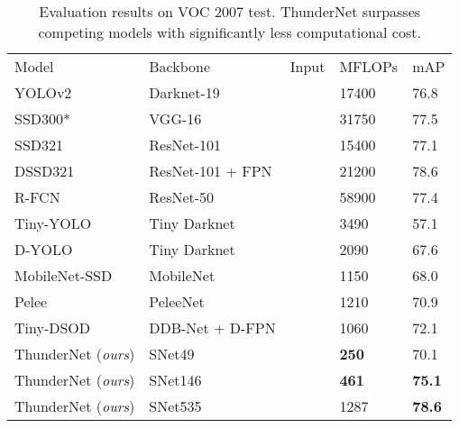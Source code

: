 \documentclass[10pt,twocolumn,letterpaper]{article}
\begin{document}
\begin{table*}[!t]
\scriptsize
\centering
\begin{tabular}{p{11em}|P{10em}|P{8em}|P{6em}|P{4em}}
Model & Backbone & Input & MFLOPs & mAP \\ 
YOLOv2 \cite{redmon2017yolo9000} & Darknet-19 &  & 17400 & 76.8 \\
SSD300* \cite{liu2016ssd} & VGG-16 &  & 31750 & 77.5 \\
SSD321 \cite{fu2017dssd} & ResNet-101 &  & 15400 & 77.1 \\
DSSD321 \cite{fu2017dssd} & ResNet-101 + FPN &  & 21200 & 78.6 \\
R-FCN \cite{dai2016r} & ResNet-50 &  & 58900 & 77.4 \\ \hline
Tiny-YOLO \cite{redmon2017yolo9000} & Tiny Darknet &  & 3490 & 57.1 \\
D-YOLO \cite{mehta2018object} & Tiny Darknet &  & 2090 & 67.6 \\
MobileNet-SSD \cite{wang2018pelee} & MobileNet &  & 1150 & 68.0 \\
Pelee \cite{wang2018pelee} & PeleeNet &  & 1210 & 70.9 \\
Tiny-DSOD \cite{li2018tiny} & DDB-Net + D-FPN &  & 1060 & 72.1 \\ \hline
ThunderNet (\emph{ours}) & SNet49 &  & \textbf{250} & 70.1 \\
ThunderNet (\emph{ours}) & SNet146 &  & \textbf{461} & \textbf{75.1} \\
ThunderNet (\emph{ours}) & SNet535 &  & 1287 & \textbf{78.6} \\
\end{tabular}
\vspace{3pt}
\caption{
Evaluation results on VOC 2007 test.
ThunderNet surpasses competing models with significantly less computational cost.
}
\label{table:results-voc}
\end{table*}
\end{document}
